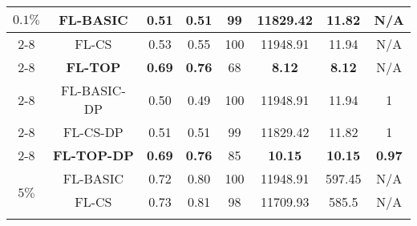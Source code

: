 \documentclass[accepted]{uai2021} %
\begin{document}
\begin{table*}[!ht]
\begin{minipage}{.5\linewidth}
{\begin{tabular}{|c|c|c|c|c|c|c|c|}
        \multirow{8}{*}{$0.1\%$} &  FL-BASIC  & 0.51 & 0.51 & 99 & 11829.42 & 11.82 & N/A \\
        \cline{2-8}
        &  FL-CS &  0.53  & 0.55 & 100 & 11948.91 & 11.94 &N/A \\
        \cline{2-8}
        &  \textbf{FL-TOP} & \textbf{0.69}  & \textbf{0.76} & 68 & \textbf{8.12} & \textbf{8.12} &N/A \\
        \cline{2-8}
        \cline{2-8}
        &  FL-BASIC-DP  & 0.50 & 0.49 & 100 & 11948.91 & 11.94 & 1  \\
        \cline{2-8}
        &  FL-CS-DP &  0.51  & 0.51 & 99 & 11829.42 & 11.82 & 1\\
        \cline{2-8}
        &  \textbf{FL-TOP-DP} &  \textbf{0.69}  & \textbf{0.76} & 85 & \textbf{10.15} & \textbf{10.15} & \textbf{0.97} \\
        \hline 
        \hline
        \multirow{8}{*}{$5\%$} &  FL-BASIC  & 0.72 & 0.80 & 100 & 11948.91 & 597.45 &N/A\\
        \cline{2-8}
        &  FL-CS &   0.73 & 0.81 & 98 & 11709.93 & 585.5 & N/A \\
        \cline{2-8}

\end{tabular}}
\end{minipage}
\end{table*}
\end{document}
